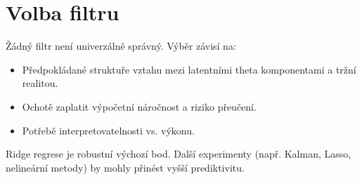 \documentclass{article}
\begin{document}
\section*{Volba filtru}

Žádný filtr není univerzálně správný. Výběr závisí na:

\begin{itemize}
    \item Předpokládané struktuře vztahu mezi latentními theta komponentami a tržní realitou.
    \item Ochotě zaplatit výpočetní náročnost a riziko přeučení.
    \item Potřebě interpretovatelnosti vs. výkonu.
\end{itemize}

Ridge regrese je robustní výchozí bod. Další experimenty (např. Kalman, Lasso, nelineární metody) by mohly přinést vyšší prediktivitu.
\end{document}
